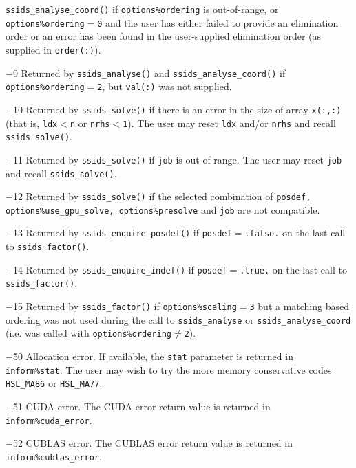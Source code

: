 \documentclass{spral}
\begin{document}
\begin{description}
            {\tt ssids\_analyse\_coord()} if {\tt options\%ordering} is
            out-of-range, or {\tt options\%ordering}$=${\tt 0} and the user
            has either failed to provide an elimination order or an error has
            been found in the user-supplied elimination order (as supplied in
            {\tt order(:)}).
\item{$-$9} Returned by {\tt ssids\_analyse()} and
            {\tt ssids\_analyse\_coord()} if {\tt options\%ordering}$=${\tt 2},
            but {\tt val(:)} was not supplied.
\item{$-$10} Returned by {\tt ssids\_solve()} if there is an error in the size
            of array {\tt x(:,:)} (that is, {\tt ldx$<$n} or {\tt nrhs$<$1}).
            The user may reset {\tt ldx} and/or {\tt nrhs} and recall
            {\tt ssids\_solve()}.
\item{$-$11} Returned by {\tt ssids\_solve()} if {\tt job} is out-of-range.
            The user may reset {\tt job} and recall {\tt ssids\_solve()}.
\item{$-$12} Returned by {\tt ssids\_solve()} if the selected combination of
            {\tt posdef{\rm ,} options\%use\_gpu\_solve{\rm ,}
            options\%presolve} and {\tt job} are not compatible.
\item{$-$13} Returned by {\tt ssids\_enquire\_posdef()} if
            {\tt posdef}$=${\tt .false.} on the last call
            to {\tt ssids\_factor()}.
\item{$-$14} Returned by {\tt ssids\_enquire\_indef()} if
            {\tt posdef}$=${\tt .true.} on the last call to
            {\tt ssids\_factor()}.
\item{$-$15} Returned by {\tt ssids\_factor()} if {\tt options\%scaling$=$3}
            but a matching based ordering was not used during the call to
            {\tt ssids\_analyse} or {\tt ssids\_analyse\_coord} (i.e. was
            called with
            {\tt options\%ordering}$\ne${\tt 2}).
\item{$-$50} Allocation error. If available, the {\tt stat}
            parameter is returned in {\tt inform\%stat}.
            The user may wish to try the more memory conservative codes
            {\tt HSL\_MA86} or {\tt HSL\_MA77}.
\item{$-$51} CUDA error. The CUDA error return value is returned in
            {\tt inform\%cuda\_error}.
\item{$-$52} CUBLAS error. The CUBLAS error return value is returned in
            {\tt inform\%cublas\_error}.
\end{description}
\end{document}

